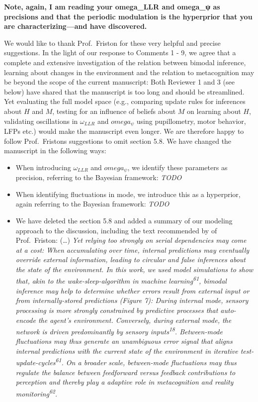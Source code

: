 \documentclass[
]{article}
\begin{document}
\textbf{Note, again, I am reading your omega\_LLR and omega\_ψ as
precisions and that the periodic modulation is the hyperprior that you
are characterizing---and have discovered.}

We would like to thank Prof.~Friston for these very helpful and precise
suggestions. In the light of our response to Comments 1 - 9, we agree
that a complete and extensive investigation of the relation between
bimodal inference, learning about changes in the environment and the
relation to metacognition may be beyond the scope of the current
manuscript: Both Reviewer 1 and 3 (see below) have shared that the
manuscript is too long and should be streamlined. Yet evaluating the
full model space (e.g., comparing update rules for inferences about
\(H\) and \(M\), testing for an influence of beliefs about \(M\) on
learning about \(H\), validating oscillations in \(\omega_{LLR}\) and
\(omega_{\psi}\) using pupillometry, motor behavior, LFPs etc.) would
make the manuscript even longer. We are therefore happy to follow
Prof.~Fristons suggestions to omit section 5.8. We have changed the
manuscript in the following ways:

\begin{itemize}
\item
  When introducing \(\omega_{LLR}\) and \(omega_{\psi}\), we identify
  these parameters as precision, referring to the Bayesian framework:
  \emph{TODO}
\item
  When identifying fluctuations in mode, we introduce this as a
  hyperprior, again referring to the Bayesian framework: \emph{TODO}
\item
  We have deleted the section 5.8 and added a summary of our modeling
  approach to the discussion, including the text recommended by of
  Prof.~Friston: (\ldots) \emph{Yet relying too strongly on serial
  dependencies may come at a cost: When accumulating over time, internal
  predictions may eventually override external information, leading to
  circular and false inferences about the state of the environment. In
  this work, we used model simulations to show that, akin to the
  wake-sleep-algorithm in machine learning\textsuperscript{61}, bimodal
  inference may help to determine whether errors result from external
  input or from internally-stored predictions (Figure 7): During
  internal mode, sensory processing is more strongly constrained by
  predictive processes that auto-encode the agent's environment.
  Conversely, during external mode, the network is driven predominantly
  by sensory inputs\textsuperscript{18}. Between-mode fluctuations may
  thus generate an unambiguous error signal that aligns internal
  predictions with the current state of the environment in iterative
  test-update-cycles\textsuperscript{61}. On a broader scale,
  between-mode fluctuations may thus regulate the balance between
  feedforward versus feedback contributions to perception and thereby
  play a adaptive role in metacognition and reality
  monitoring\textsuperscript{62}.}
\end{itemize}
\end{document}
